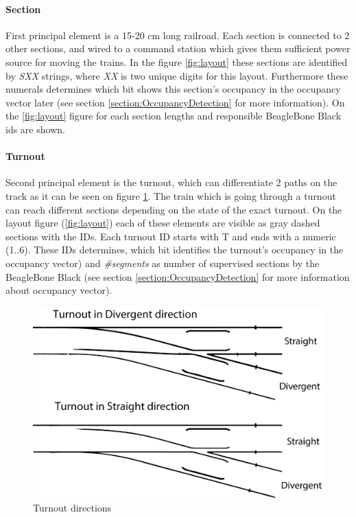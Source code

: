 \paragraph{Section} 
First principal  element is a 15-20 cm long railroad. Each section is connected to 2 other sections, and wired to a command station which gives them sufficient power source for moving the trains. In the figure \ref{fig:layout} these sections are identified by \textit{SXX} strings, where \textit{XX} is two unique digits for this layout. Furthermore these numerals determines which bit shows this section's occupancy in the occupancy vector later (see section \ref{section:OccupancyDetection} for more information). On the \ref{fig:layout} figure for each section lengths and responsible BeagleBone Black ids are shown.

\paragraph{Turnout}
Second principal element is the turnout, which can differentiate 2 paths on the track as it can be seen on figure \ref{fig:turnoutDir}. The train which is going through a turnout can reach different sections depending on the state of the exact turnout. On the layout figure (\ref{fig:layout}) each of these elements are visible as gray dashed sections with the IDs. Each turnout ID starts with T and ends with a numeric (1..6). These IDs determines, which bit identifies the turnout's occupancy in the occupancy vector) and \textit{\#segments} as number of supervised sections by the BeagleBone Black (see section \ref{section:OccupancyDetection} for more information about occupancy vector).
\begin{figure}[!h]
	\centering
	\includegraphics[width=150mm]{figures/modes3/turnout.png}
	\caption{Turnout directions}
	\label{fig:turnoutDir}
\end{figure}

